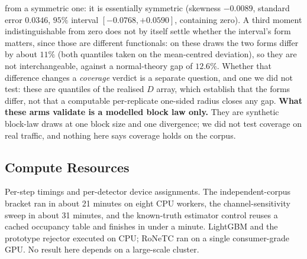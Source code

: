 \documentclass[sigconf,anonymous,review]{acmart}
\begin{document}
from a symmetric one: it is essentially symmetric (skewness $-0.0089$, standard error $0.0346$,
$95\%$ interval $[-0.0768, +0.0590]$, containing zero). A third moment
indistinguishable from zero does not by itself settle whether the interval's
form matters, since those are different functionals: on these draws the two
forms differ by about $11\%$ (both quantiles taken on the mean-centred
deviation), so they are not interchangeable, against a normal-theory gap
of $12.6\%$. Whether that difference changes
a \emph{coverage} verdict is a separate question, and one we did not test: these
are quantiles of the realised $D$ array, which establish that the forms differ,
not that a computable per-replicate one-sided radius closes any gap. \textbf{What these arms validate is a modelled block law only.}
They are synthetic block-law draws at one block size and one divergence; we did
not test coverage on real traffic, and nothing here says coverage holds on the
corpus.

\subsection{Compute Resources}
\label{sec:appendix/compute}

Per-step timings and per-detector device assignments. The independent-corpus
bracket ran in about 21 minutes on eight CPU workers, the channel-sensitivity
sweep in about 31 minutes, and the known-truth estimator control reuses a
cached occupancy table and finishes in under a minute. LightGBM and the
prototype rejector executed on CPU; RoNeTC ran on a single consumer-grade GPU.
No result here depends on a large-scale cluster.
\end{document}
